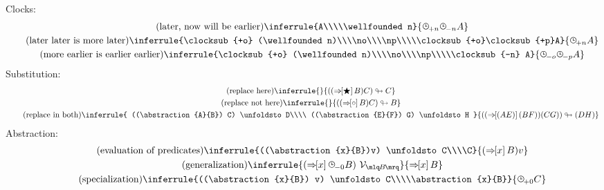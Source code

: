 \documentclass{article}
\begin{document}
  Clocks:
  \begin{gather*}
    \tag{later, now will be earlier}\label{lne}
    \inferrule{A\\\\\wellfounded n}{\clocksub{+n} \clocksub{-n} A}\\
    \tag{later later is more later}
    \inferrule{\clocksub{+o} (\wellfounded n)\\\\no\\\\np\\\\\clocksub{+o}\clocksub{+p}A}{\clocksub{+n} A}\\
    \tag{more earlier is earlier earlier}
    \inferrule{\clocksub{+o} (\wellfounded n)\\\\no\\\\np\\\\\clocksub{-n} A}{\clocksub{-o}\clocksub{-p}A}\\
  \end{gather*}
  Substitution:
  \begin{gather*}
    \tag{replace here}
    \inferrule{}{((\abstraction{\here}{B}) C) \unfoldsto C}\\
    \tag{replace not here}
    \inferrule{}{((\abstraction{\hole}{B}) C) \unfoldsto B}\\
    \tag{replace in both}
    \inferrule{
      ((\abstraction{A}{B}) C) \unfoldsto D\\\\
      ((\abstraction{E}{F}) G) \unfoldsto H
    }{
      ((\abstraction{(AE)}{(BF)}) (CG)) \unfoldsto (DH)
    }\\
  \end{gather*}
  Abstraction:
  \begin{gather*}
    \tag{evaluation of predicates}
    \inferrule{((\abstraction{x}{B})v) \unfoldsto C\\\\C}{(\abstraction{x}{B})v}\\
    \tag{generalization}
    \inferrule{(\abstraction{x}{\clocksub{-\wfz}B})\ \variable{B}}{\abstraction{x}{B}}\\
    \tag{specialization}
    \inferrule{((\abstraction{x}{B}) v) \unfoldsto C\\\\\abstraction{x}{B}}{\clocksub{+\wfz} C}\\
  \end{gather*}
\end{document}
